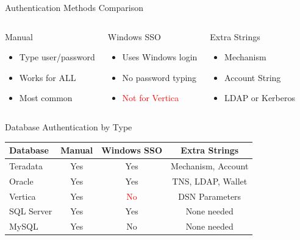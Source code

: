 \documentclass{beamer}
\begin{document}
	\begin{frame}{Authentication Methods Comparison}
		\begin{columns}[T]
			\begin{block}{Manual}
				\begin{itemize}
					\small
					\item Type user/password
					\item Works for ALL
					\item Most common
				\end{itemize}
			\end{block}
			
			\begin{block}{Windows SSO}
				\begin{itemize}
					\small
					\item Uses Windows login
					\item No password typing
					\item \textcolor{red}{Not for Vertica}
				\end{itemize}
			\end{block}
			
			\begin{block}{Extra Strings}
				\begin{itemize}
					\small
					\item Mechanism
					\item Account String
					\item LDAP or Kerberos
				\end{itemize}
			\end{block}
		\end{columns}
	\end{frame}
	
	\begin{frame}{Database Authentication by Type}
		\begin{center}
			\begin{tabular}{|l|c|c|c|}
				\hline
				\textbf{Database} & \textbf{Manual} & \textbf{Windows SSO} & \textbf{Extra Strings} \\
				\hline
				Teradata & Yes & Yes & Mechanism, Account \\
				\hline
				Oracle & Yes & Yes & TNS, LDAP, Wallet \\
				\hline
				Vertica & Yes & \textcolor{red}{No} & DSN Parameters \\
				\hline
				SQL Server & Yes & Yes & None needed \\
				\hline
				MySQL & Yes & No & None needed \\
				\hline
			\end{tabular}
		\end{center}
	\end{frame}
	
\end{document}

